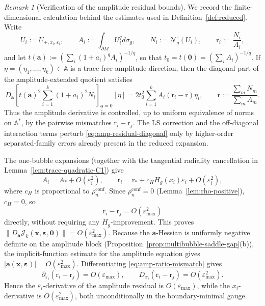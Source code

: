 \documentclass[11pt,reqno,a4paper]{amsart}
\numberwithin{equation}{section}
\theoremstyle{plain}
\theoremstyle{remark}
\newtheorem{remark}[theorem]{Remark}
\theoremstyle{plain}
\begin{document}
\begin{remark}[Verification of the amplitude residual bounds]\label{rem:amp-residual-verification}
We record the finite-dimensional calculation behind the estimates used in
Definition~\ref{def:reduced}.  Write
\[
U_i:=U_{+,x_i,\varepsilon_i},\qquad
A_i:=\int_{\partial M}U_i^qd\sigma_g,\qquad
N_i:=\mathcal N_g^\circ(U_i),\qquad
\mathrm r_i:=\frac{N_i}{A_i},
\]
and let $t(\mathbf a):=(\sum_i(1+a_i)^qA_i)^{-1/q}$, so that
$t_0=t(\mathbf 0)=(\sum_iA_i)^{-1/q}$.  If
$\eta=(\eta_1,\dots,\eta_k)\in\mathbb A$ is a trace-free amplitude direction, then the
diagonal part of the amplitude-extended quotient satisfies
\begin{equation}\label{eq:amp-residual-diagonal}
D_{\mathbf a}\left[t(\mathbf a)^2\sum_{i=1}^k(1+a_i)^2N_i\right]_{\mathbf a=0}[\eta]
=2t_0^2\sum_{i=1}^k A_i(\mathrm r_i-\bar{\mathrm r})\eta_i,
\qquad
\bar{\mathrm r}:=\frac{\sum_mN_m}{\sum_mA_m}.
\end{equation}
Thus the amplitude derivative is controlled, up to uniform equivalence of norms on
$\mathbb A^*$, by the pairwise mismatches $\mathrm r_i-\mathrm r_j$.  The LS correction
and the off-diagonal interaction terms perturb \eqref{eq:amp-residual-diagonal} only by
higher-order separated-family errors already present in the reduced expansion.

The one-bubble expansions (together with the tangential radiality cancellation in
Lemma~\ref{lem:trace-quadratic-C1}) give
\[
A_i=A_\ast+O(\varepsilon_i^2),\qquad
\mathrm r_i=\mathrm r_\ast+c_H H_g(x_i)\varepsilon_i+O(\varepsilon_i^2),
\]
where $c_H$ is proportional to $\rho_n^{\mathrm{conf}}$.
Since $\rho_n^{\mathrm{conf}}=0$ (Lemma~\ref{lem:rho-positive}), $c_H=0$, so
\begin{equation}\label{eq:amp-ratio-mismatch}
\mathrm r_i-\mathrm r_j
=O(\varepsilon_{\max}^2)
\end{equation}
directly, without requiring any $H_g$-improvement.
This proves
$\|D_{\mathbf a}\mathcal J_k(\mathbf x,\boldsymbol\varepsilon,\mathbf 0)\|=O(\varepsilon_{\max}^2)$.
Because the $\mathbf a$-Hessian is uniformly negative definite on the amplitude block
(Proposition~\ref{prop:multibubble-saddle-gap}\textup{(b)}), the implicit-function estimate for the
amplitude equation gives
$|\mathbf a(\mathbf x,\boldsymbol\varepsilon)|=O(\varepsilon_{\max}^2)$.
Differentiating \eqref{eq:amp-ratio-mismatch} gives
\[
\partial_{\varepsilon_i}(\mathrm r_i-\mathrm r_j)
=O(\varepsilon_{\max}),\qquad
D_{x_i}(\mathrm r_i-\mathrm r_j)
=O(\varepsilon_{\max}^2).
\]
Hence the $\varepsilon_i$-derivative of the amplitude residual is
$O(\varepsilon_{\max})$, while the $x_i$-derivative is
$O(\varepsilon_{\max}^2)$, both unconditionally in the boundary-minimal gauge.
\end{remark}
\end{document}
